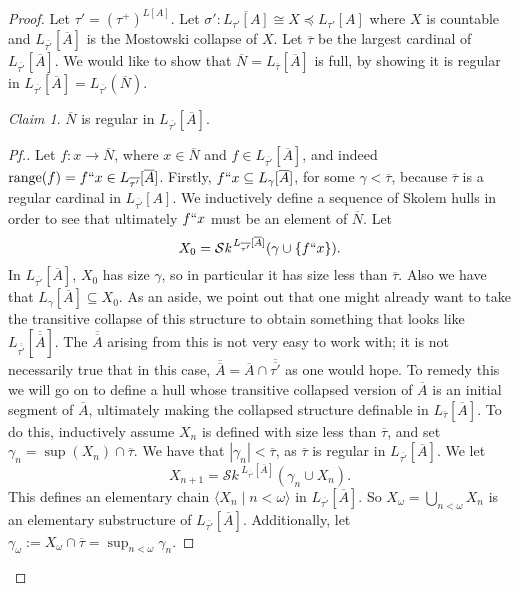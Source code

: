 \documentclass{amsart}
\theoremstyle{definition}
\theoremstyle{remark}
\newtheorem*{claim}{Claim}
\newcommand{\N}{{\overline{N}}}
\DeclareMathOperator{\ran}{range}
\newcommand{\st}{\; | \;}
\newcommand{\seq}[2]{\langle #1 \st #2 \rangle}
\newcommand{\SH}{\mathcal{S}\textit{k} \,}
\newcommand{\Sk}[3]{\SH^{#1}( {#2} \cup {#3} ) }
\begin{document}
\begin{proof}
Let $\tau'=(\tau^+)^{L[A]}$. Let $\sigma' : \overline{L_{\tau'}[A]} \cong X \preccurlyeq L_{\tau'}[A]$ where $X$ is countable and $L_{\overline{\tau'}}[\overline A]$ is the Mostowski collapse of $X$. Let $\overline \tau$ be the largest cardinal of $L_{\overline{\tau'}}[\overline A]$. We would like to show that $\N = L_{\overline{\tau}}[\overline A]$ is full, by showing it is regular in $L_{\overline{\tau'}}[\overline A] = L_{\overline{\tau'}}(\N)$.
\begin{claim} $\N$ is regular in $L_{\overline{\tau'}}[\overline A]$. \end{claim}
\begin{proof}[Pf.] 
Let $f:x \longrightarrow \overline N$, where $x \in \N$ and $f \in L_{\overline{\tau'}}[\overline A]$, and indeed $\ran(f)= f``x \in L_{\overline{\tau'}}[\overline A]$. Firstly, $f`` x \subseteq L_\gamma[\overline A]$, for some $\gamma < \overline \tau$, because $\overline \tau$ is a regular cardinal in $L_{\overline{\tau'}}[A]$. We inductively define a sequence of Skolem hulls in order to see that ultimately $f``x$ must be an element of $\N$.
Let 
	$$X_0 = \Sk{L_{\overline{\tau'}}[\overline A]}{\gamma}{\{f``x\}}.$$
In $L_{\overline{\tau'}}[\overline A]$, $X_0$ has size $\gamma$, so in particular it has size less than $\overline \tau$. Also we have that $L_\gamma[\overline A] \subseteq X_0$. As an aside, we point out that one  might already want to take the transitive collapse of this structure to obtain something that looks like $L_{\overline{\overline{\tau'}}}[\overline{\overline A}]$. The $\overline{\overline A}$ arising from this is not very easy to work with; it is not necessarily true that in this case, $\overline{\overline A} = \overline A \cap {\overline{\overline{\tau'}}}$ as one would hope. To remedy this we will go on to define a hull whose transitive collapsed version of $\overline A$ is an initial segment of $\overline A$, ultimately making the collapsed structure definable in $L_{\overline \tau}[\overline A]$. To do this, inductively assume $X_n$ is defined with size less than $\overline \tau$, and set $\gamma_n = \sup(X_n) \cap \overline \tau$. We have that $|\gamma_n|<\overline \tau$, as $\overline \tau$ is regular in $L_{\overline{\tau'}}[\overline A]$. We let 
	$$X_{n+1} = \Sk{L_{\overline{\tau'}}[\overline A]}{\gamma_n}{X_n}.$$
This defines an elementary chain $\seq{X_n}{n<\omega}$ in $L_{\overline{\tau'}}[\overline A]$. So $X_\omega = \bigcup_{n<\omega}X_n$ is an elementary substructure of $L_{\overline{\tau'}}[\overline A]$. Additionally, let $\gamma_\omega:=X_\omega \cap \overline \tau = \sup_{n<\omega}{\gamma_n}$. 


\end{proof}
\end{proof}
\end{document}
